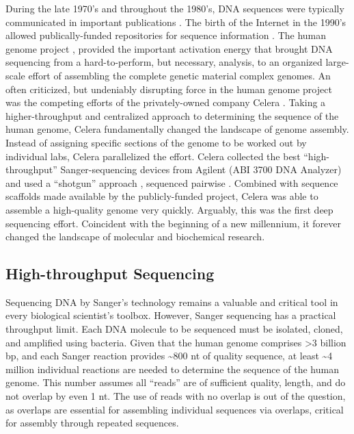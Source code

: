    During the late 1970's and throughout the 1980's, DNA sequences were typically communicated in important publications \citep{Cordell1980a,Sanger1978a}. The birth of the Internet in the 1990's allowed publically-funded repositories for sequence information \citep{Benson2011a}. The human genome project \citep{Lander2011a,Venter2001}, provided the important activation energy that brought DNA sequencing from a hard-to-perform, but necessary, analysis, to an organized large-scale effort of assembling the complete genetic material complex genomes. An often criticized, but undeniably disrupting force in the human genome project was the competing efforts of the privately-owned company Celera \citep{Venter2008a}. Taking a higher-throughput and centralized approach to determining the sequence of the human genome, Celera fundamentally changed the landscape of genome assembly. Instead of assigning specific sections of the genome to be worked out by individual labs, Celera parallelized the effort. Celera collected the best ``high-throughput'' Sanger-sequencing devices from Agilent (ABI 3700 DNA Analyzer) and used a ``shotgun'' approach \citep{Staden1979}, sequenced pairwise \citep{Roach1995}. Combined with sequence scaffolds made available by the publicly-funded project, Celera was able to assemble a high-quality genome very quickly. Arguably, this was the first deep sequencing effort. Coincident with the beginning of a new millennium, it forever changed the landscape of molecular and biochemical research.

  \subsection{High-throughput Sequencing}
    \label{Intro:subsec: History of HTS}

    Sequencing DNA by Sanger's technology remains a valuable and critical tool in every biological scientist's toolbox. However, Sanger sequencing has a practical throughput limit. Each DNA molecule to be sequenced must be isolated, cloned, and amplified using bacteria. Given that the human genome \citep{Hattori2005a} comprises >3 billion bp, and each Sanger reaction provides \textasciitilde800 nt of quality sequence, at least \textasciitilde4 million individual reactions are needed to determine the sequence of the human genome. This number assumes all ``reads'' are of sufficient quality, length, and do not overlap by even 1 nt. The use of reads with no overlap is out of the question, as overlaps are essential for assembling individual sequences via overlaps, critical for assembly through repeated sequences.

